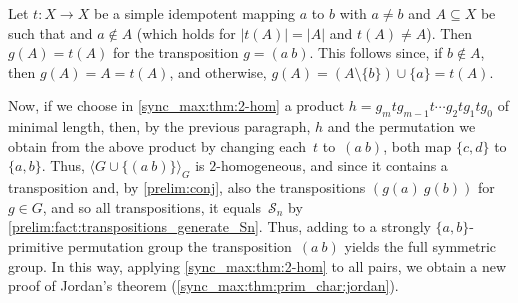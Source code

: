 \begin{remark}
	Let $t \colon X \to X$ be a simple idempotent mapping $a$ to $b$ with $a \ne b$
	and $A \subseteq X$ be such that and $a \notin A$ (which holds for $|t(A)| = |A|$ and $t(A) \ne A$).
	Then $g(A) = t(A)$ for the transposition $g = (a ~ b)$.
	This follows since, if $b \notin A$, then $g(A) = A = t(A)$,
	and otherwise, $g(A) = ( A \setminus \{ b \} ) \cup \{a\} = t(A)$.	
		
	Now, if we choose in \cref{sync_max:thm:2-hom} a product 
	$
	h = g_m t g_{m-1} t \cdots g_2 t g_1 t g_0  
	$
	of minimal length, then, by the previous paragraph,
	$h$ and the permutation we obtain from the above
	product by changing each~$t$ to~$(a ~ b)$,
	both map $\{c,d\}$ to $\{a,b\}$.
	Thus, $\langle G \cup \{(a ~ b)\} \rangle_G$
	is $2$-homogeneous,
	and since it contains a transposition
	and, by \cref{prelim:conj},
	also the transpositions $(g(a) ~ g(b))$ for $g \in G$,
	and so all transpositions, it equals~$\mathcal S_n$ by \cref{prelim:fact:transpositions_generate_Sn}.
	Thus, adding to a strongly $\{a,b\}$-primitive permutation group
	the transposition~$(a ~ b)$ yields the full symmetric group.
	In this way, applying \cref{sync_max:thm:2-hom} to all pairs,
	we obtain a new proof of Jordan's theorem (\cref{sync_max:thm:prim_char:jordan}).
\end{remark}